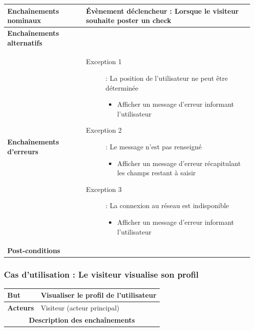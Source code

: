 \documentclass[a4paper,12pt]{report}
\begin{document}
\begin{onehalfspace}
\begin{tabular}{|p{3cm}|p{}|}
\textbf{Enchaînements nominaux} &
  Évènement déclencheur : Lorsque le visiteur souhaite poster un check
\\ \hline %

\textbf{Enchaînements alternatifs} &
\\ \hline %

\textbf{Enchaînements d'erreurs} &
  \begin{description}
    \item[Exception 1]: La position de l'utilisateur ne peut être déterminée
    \begin{itemize}
      \item Afficher un message d’erreur informant l'utilisateur
    \end{itemize}
    \item[Exception 2]: Le message n'est pas renseigné
    \begin{itemize}
      \item Afficher un message d’erreur récapitulant les champs restant à saisir
    \end{itemize}
    \item[Exception 3]: La connexion au réseau est indisponible
    \begin{itemize}
      \item Afficher un message d’erreur informant l'utilisateur
    \end{itemize}
  \end{description}
\\ \hline %

\textbf{Post-conditions} &
\\ \hline %

\end{tabular}


\subsubsection{Cas d'utilisation : Le visiteur visualise son profil}
\begin{tabular}{|p{3cm}|p{}|}
\hline %

\textbf{But} &
Visualiser le profil de l'utilisateur
\\ \hline %

\textbf{Acteurs} &
Visiteur (acteur principal)
\\ \hline %

\multicolumn{2}{|c|}{\textbf{Description des enchaînements}}
\\ \hline %


\end{tabular}
\end{onehalfspace}
\end{document}
